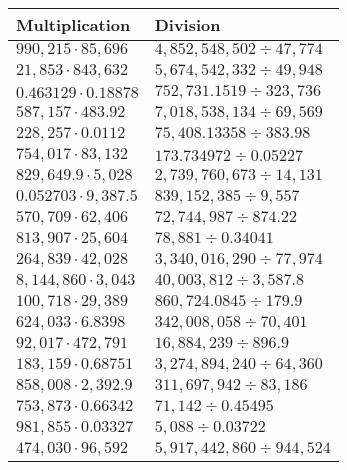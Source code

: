 \begin{longtable}[]{@{}ll@{}}
\toprule
Multiplication & Division\tabularnewline
\midrule
\endhead
\(990,215\cdot85,696\) & \(4,852,548,502÷47,774\)\tabularnewline
\(21,853\cdot843,632\) & \(5,674,542,332÷49,948\)\tabularnewline
\(0.463129\cdot0.18878\) & \(752,731.1519÷323,736\)\tabularnewline
\(587,157\cdot483.92\) & \(7,018,538,134÷69,569\)\tabularnewline
\(228,257\cdot0.0112\) & \(75,408.13358÷383.98\)\tabularnewline
\(754,017\cdot83,132\) & \(173.734972÷0.05227\)\tabularnewline
\(829,649.9\cdot5,028\) & \(2,739,760,673÷14,131\)\tabularnewline
\(0.052703\cdot9,387.5\) & \(839,152,385÷9,557\)\tabularnewline
\(570,709\cdot62,406\) & \(72,744,987÷874.22\)\tabularnewline
\(813,907\cdot25,604\) & \(78,881÷0.34041\)\tabularnewline
\(264,839\cdot42,028\) & \(3,340,016,290÷77,974\)\tabularnewline
\(8,144,860\cdot3,043\) & \(40,003,812÷3,587.8\)\tabularnewline
\(100,718\cdot29,389\) & \(860,724.0845÷179.9\)\tabularnewline
\(624,033\cdot6.8398\) & \(342,008,058÷70,401\)\tabularnewline
\(92,017\cdot472,791\) & \(16,884,239÷896.9\)\tabularnewline
\(183,159\cdot0.68751\) & \(3,274,894,240÷64,360\)\tabularnewline
\(858,008\cdot2,392.9\) & \(311,697,942÷83,186\)\tabularnewline
\(753,873\cdot0.66342\) & \(71,142÷0.45495\)\tabularnewline
\(981,855\cdot0.03327\) & \(5,088÷0.03722\)\tabularnewline
\(474,030\cdot96,592\) & \(5,917,442,860÷944,524\)\tabularnewline
\bottomrule
\end{longtable}

